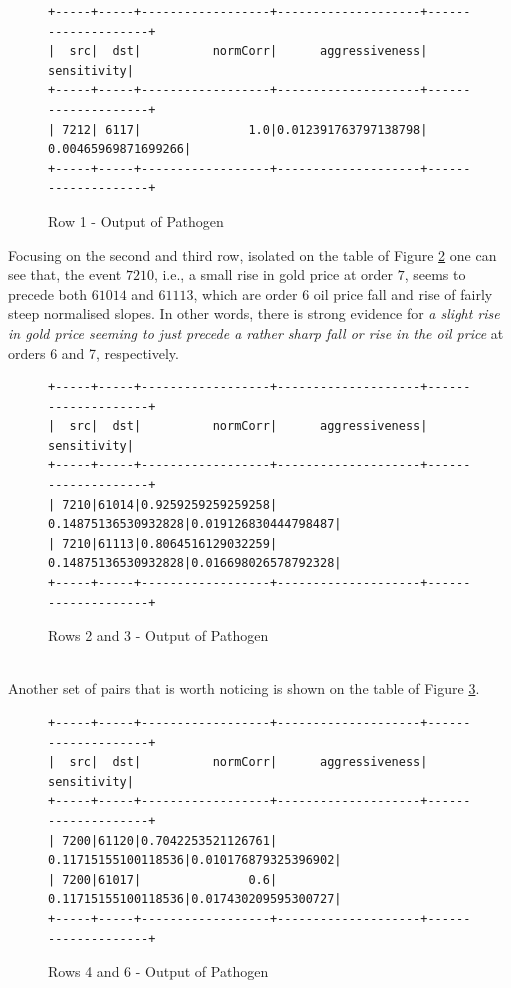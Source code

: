 \documentclass[a4, 11pt]{article}
\begin{document}
\begin{figure}[h!]
\centering
    \begin{BVerbatim}[baselinestretch=0.1,fontsize=\fontsize{12}{0}\selectfont]
+-----+-----+------------------+--------------------+--------------------+
|  src|  dst|          normCorr|      aggressiveness|         sensitivity|
+-----+-----+------------------+--------------------+--------------------+
| 7212| 6117|               1.0|0.012391763797138798| 0.00465969871699266|
+-----+-----+------------------+--------------------+--------------------+
    \end{BVerbatim}
    \caption{Row 1 - Output of Pathogen}
    \label{fig:graph1}
\end{figure}
Focusing on the second and third row, isolated on the table of Figure \ref{fig:graph2} one can see that, 
the event $7210$, i.e., a small rise in gold price at order $7$, seems to precede both $61014$ and $61113$, which are order $6$ oil price fall and rise of fairly steep normalised slopes. In other words, there is strong evidence for \textit{a slight rise in gold price seeming to just precede a rather sharp fall or rise in the oil price} at orders 6 and 7, respectively.
\begin{figure}[!h]
\centering
    \begin{BVerbatim}[baselinestretch=0.1,fontsize=\fontsize{12}{0}\selectfont]
+-----+-----+------------------+--------------------+--------------------+
|  src|  dst|          normCorr|      aggressiveness|         sensitivity|
+-----+-----+------------------+--------------------+--------------------+
| 7210|61014|0.9259259259259258| 0.14875136530932828|0.019126830444798487|
| 7210|61113|0.8064516129032259| 0.14875136530932828|0.016698026578792328|
+-----+-----+------------------+--------------------+--------------------+
    \end{BVerbatim}
    \caption{Rows 2 and 3 - Output of Pathogen}
    \label{fig:graph2}
\end{figure}
\\Another set of pairs that is worth noticing is shown on the table of Figure \ref{fig:graph3}.
\begin{figure}[!ht]
\centering
    \begin{BVerbatim}[baselinestretch=0.1,fontsize=\fontsize{12}{0}\selectfont]
+-----+-----+------------------+--------------------+--------------------+
|  src|  dst|          normCorr|      aggressiveness|         sensitivity|
+-----+-----+------------------+--------------------+--------------------+
| 7200|61120|0.7042253521126761| 0.11715155100118536|0.010176879325396902|
| 7200|61017|               0.6| 0.11715155100118536|0.017430209595300727|
+-----+-----+------------------+--------------------+--------------------+
    \end{BVerbatim}
    \caption{Rows 4 and 6 - Output of Pathogen}
    \label{fig:graph3}
\end{figure}
\end{document}
